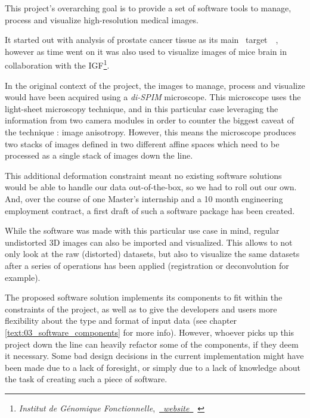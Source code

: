 {
	This project's overarching goal is to provide a set of software tools to manage, process and visualize high-resolution medical images.\par
	It started out with analysis of prostate cancer tissue as its main \guillemotleft~target~\guillemotright~, however as time went on it was also used to visualize images of mice brain in collaboration with the IGF\footnote{\textit{Institut de Génomique Fonctionnelle},~\href{https://www.igf.cnrs.fr/index.php/en/}{~\underline{\textit{website}}~}~}.

	\vspace{\baselineskip}

	In the original context of the project, the images to manage, process and visualize would have been acquired using a \textit{di-SPIM} microscope. This microscope uses the light-sheet microscopy technique, and in this particular case leveraging the information from two camera modules in order to counter the biggest caveat of the technique : image anisotropy. However, this means the microscope produces two stacks of images defined in two different affine spaces which need to be processed as a single stack of images down the line.\par

	\vspace{\baselineskip}

	This additional deformation constraint meant no existing software solutions would be able to handle our data out-of-the-box, so we had to roll out our own. And, over the course of one Master's internship and a 10 month engineering employment contract, a first draft of such a software package has been created.\par

	\vspace{\baselineskip}

	While the software was made with this particular use case in mind, regular undistorted 3D images can also be imported and visualized. This allows to not only look at the raw (distorted) datasets, but also to visualize the same datasets after a series of operations has been applied (registration or deconvolution for example).

	\vspace{\baselineskip}

	The proposed software solution implements its components to fit within the constraints of the project, as well as to give the developers and users more flexibility about the type and format of input data (see chapter \ref{text:03_software_components} for more info). However, whoever picks up this project down the line can heavily refactor some of the components, if they deem it necessary. Some bad design decisions in the current implementation might have been made due to a lack of foresight, or simply due to a lack of knowledge about the task of creating such a piece of software.
}

